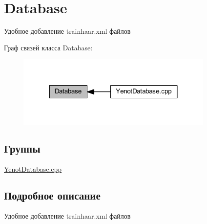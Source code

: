 \hypertarget{group__database}{}\section{Database}
\label{group__database}


Удобное добавление trainhaar.\+xml файлов  


Граф связей класса Database\+:
\nopagebreak
\begin{figure}[H]
\begin{center}
\leavevmode
\includegraphics[width=276pt]{group__database}
\end{center}
\end{figure}
\subsection*{Группы}
\begin{DoxyCompactItemize}
\item 
\mbox{\hyperlink{group__yenotdatabasecpp}{Yenot\+Database.\+cpp}}
\end{DoxyCompactItemize}


\subsection{Подробное описание}
Удобное добавление trainhaar.\+xml файлов 

